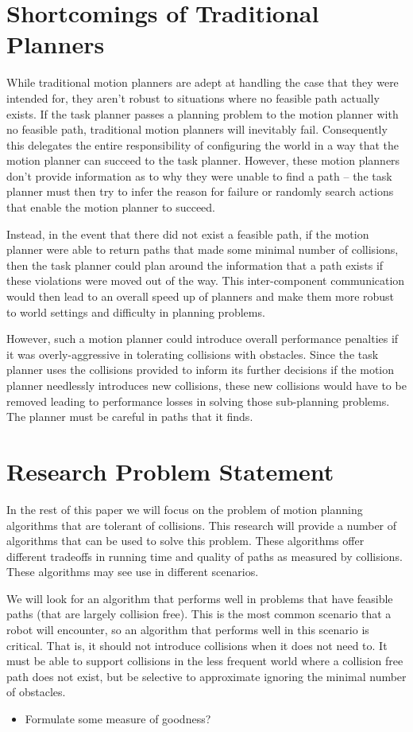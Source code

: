 \section{Shortcomings of Traditional Planners} \label{intro:shortcomings}
While traditional motion planners are adept at handling the case that they were intended for, they aren't robust to situations where no feasible path actually exists. If the task planner passes a planning problem to the motion planner with no feasible path, traditional motion planners will inevitably fail. Consequently this delegates the entire responsibility of configuring the world in a way that the motion planner can succeed to the task planner. However, these motion planners don't provide information as to why they were unable to find a path -- the task planner must then try to infer the reason for failure or randomly search actions that enable the motion planner to succeed.

Instead, in the event that there did not exist a feasible path, if the motion planner were able to return paths that made some minimal number of collisions, then the task planner could plan around the information that a path exists if these violations were moved out of the way. This inter-component communication would then lead to an overall speed up of planners and make them more robust to world settings and difficulty in planning problems.

However, such a motion planner could introduce overall performance penalties if it was overly-aggressive in tolerating collisions with obstacles. Since the task planner uses the collisions provided to inform its further decisions if the motion planner needlessly introduces new collisions, these new collisions would have to be removed leading to performance losses in solving those sub-planning problems. The planner must be careful in paths that it finds.

\section{Research Problem Statement} \label{intro:statement}
In the rest of this paper we will focus on the problem of motion planning algorithms that are tolerant of collisions. This research will provide a number of algorithms that can be used to solve this problem. These algorithms offer different tradeoffs in running time and quality of paths as measured by collisions. These algorithms may see use in different scenarios.

We will look for an algorithm that performs well in problems that have feasible paths (that are largely collision free). This is the most common scenario that a robot will encounter, so an algorithm that performs well in this scenario is critical. That is, it should not introduce collisions when it does not need to. It must be able to support collisions in the less frequent world where a collision free path does not exist, but be selective to approximate ignoring the minimal number of obstacles.
\begin{itemize}
    \item Formulate some measure of goodness?
\end{itemize}

